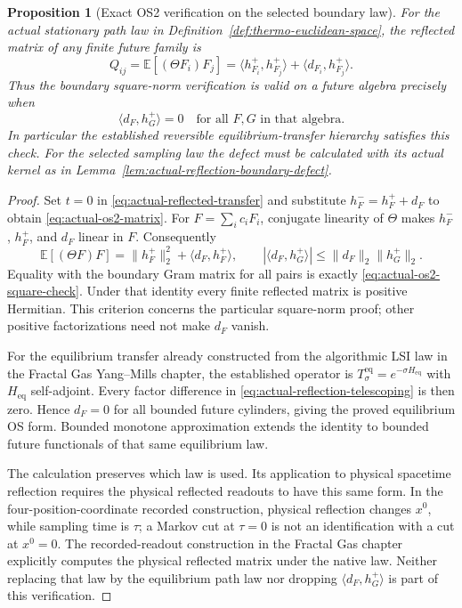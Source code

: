 \documentclass[11pt]{article}
\newtheorem{proposition}[theorem]{Proposition}
\theoremstyle{definition}
\theoremstyle{remark}
\begin{document}
\begin{proposition}[Exact OS2 verification on the selected boundary law]
\label{prop:os2}
For the actual stationary path law in
Definition~\ref{def:thermo-euclidean-space}, the reflected matrix of any
finite future family is
\begin{equation}
Q_{ij}=\mathbb E[(\Theta F_i)F_j]
=\langle h_{F_i}^+,h_{F_j}^+\rangle
 +\langle d_{F_i},h_{F_j}^+\rangle.
\label{eq:actual-os2-matrix}
\end{equation}
Thus the boundary square-norm verification is valid on a future algebra
precisely when
\begin{equation}
\langle d_F,h_G^+\rangle=0
\quad\text{for all }F,G\text{ in that algebra}.
\label{eq:actual-os2-square-check}
\end{equation}
In particular the established reversible equilibrium-transfer hierarchy
satisfies this check. For the selected sampling law the defect must be
calculated with its actual kernel as in
Lemma~\ref{lem:actual-reflection-boundary-defect}.
\end{proposition}

\begin{proof}
Set $t=0$ in \eqref{eq:actual-reflected-transfer} and substitute
$h_F^-=h_F^++d_F$ to obtain \eqref{eq:actual-os2-matrix}.
For $F=\sum_i c_iF_i$, conjugate linearity of $\Theta$ makes $h_F^-$,
$h_F^+$, and $d_F$ linear in $F$. Consequently
\[
\mathbb E[(\Theta F)F]=\|h_F^+\|_2^2+\langle d_F,h_F^+\rangle,
\qquad
|\langle d_F,h_G^+\rangle|\le\|d_F\|_2\|h_G^+\|_2.
\]
Equality with the boundary Gram matrix for all pairs is exactly
\eqref{eq:actual-os2-square-check}. Under that identity every finite
reflected matrix is positive Hermitian. This criterion concerns the
particular square-norm proof; other positive factorizations need not
make $d_F$ vanish.

For the equilibrium transfer already constructed from the algorithmic
LSI law in the Fractal Gas Yang--Mills chapter, the established operator
is $T_\sigma^{\mathrm{eq}}=e^{-\sigma H_{\mathrm{eq}}}$ with
$H_{\mathrm{eq}}$ self-adjoint. Every factor difference in
\eqref{eq:actual-reflection-telescoping} is then zero. Hence $d_F=0$
for all bounded future cylinders, giving the proved equilibrium OS
form. Bounded monotone approximation extends the identity to bounded
future functionals of that same equilibrium law.

The calculation preserves which law is used. Its application to physical
spacetime reflection requires the physical reflected readouts to have
this same form. In the four-position-coordinate recorded construction,
physical reflection changes $x^0$, while sampling time is $\tau$;
a Markov cut at $\tau=0$ is not an identification with a cut at $x^0=0$.
The recorded-readout construction in the Fractal Gas chapter explicitly
computes the physical reflected matrix under the native law.
Neither replacing that law by the equilibrium path law nor dropping
$\langle d_F,h_G^+\rangle$ is part of this verification.
\end{proof}
\end{document}
